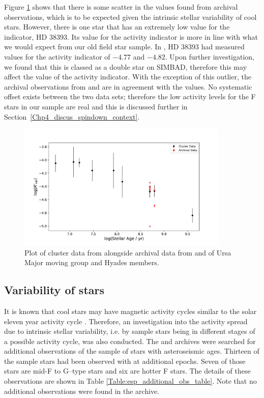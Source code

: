 Figure \ref{fig:cluster_data_comparison} shows that there is some scatter in the \Rprime values found from archival observations, which is to be expected given the intrinsic stellar variability of cool stars. However, there is one star that has an extremely low value for the \Rprime indicator, HD 38393. Its value for the \Rprime activity indicator is more in line with what we would expect from our old field star sample. In \citet{Mamajek_Hillenbrand_2008}, HD 38393 had measured values for the \Rprime activity indicator of $-4.77$ and $-4.82$. Upon further investigation, we found that this is classed as a double star on SIMBAD, therefore this may affect the value of the \Rprime activity indicator. With the exception of this outlier, the archival observations from \esp and \narval are in agreement with the \citet{Mamajek_Hillenbrand_2008} values. No systematic offset exists between the two data sets; therefore the low activity levels for the F stars in our sample are real and this is discussed further in Section~\ref{Chp4_discus_spindown_context}.

\begin{figure}
    \centering
    \includegraphics[width=0.9\textwidth]{Figures/4-Chromospheric_age/cluster_data.pdf}
    \caption[Analysis of cluster members]{Plot of cluster data from \citet{Mamajek_Hillenbrand_2008} alongside archival data from \esp and \narval of Ursa Major moving group and Hyades members.}
    \label{fig:cluster_data_comparison}
\end{figure}

\subsection{Variability of stars}
\label{Chp4_results_variability}
It is known that cool stars may have magnetic activity cycles similar to the solar eleven year activity cycle \citep{Wilson_1978,Baliunas_etal_1995}. Therefore, an investigation into the activity spread due to intrinsic stellar variability, i.e. by sample stars being in different stages of a possible activity cycle, was also conducted. The \esp and \narval archives were searched for additional observations of the sample of stars with asteroseismic ages. Thirteen of the sample stars had been observed with \esp at additional epochs. Seven of those stars are mid-F to G--type stars and six are hotter F stars. The details of these observations are shown in Table \ref{Table:esp_additional_obs_table}. Note that no additional observations were found in the \narval archive.

